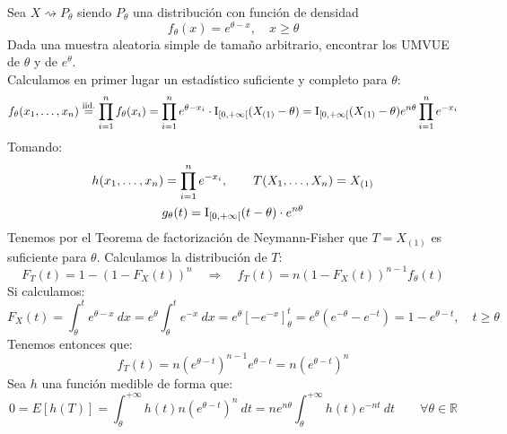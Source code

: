 \begin{ejercicio}\label{ej:7_rel4}
    Sea $X\rightsquigarrow P_\theta$ siendo $P_\theta$ una distribución con función de densidad
    \begin{equation*}
        f_\theta(x) = e^{\theta-x}, \quad x\geq \theta
    \end{equation*}
    Dada una muestra aleatoria simple de tamaño arbitrario, encontrar los UMVUE de $\theta$ y de $e^{\theta}$.\\

    \noindent
    Calculamos en primer lugar un estadístico suficiente y completo para $\theta$:
    \begin{equation*}
        f_\theta(x_1, \ldots, x_n) \stackrel{\text{iid.}}{=} \prod_{i=1}^{n}f_\theta(x_i) = \prod_{i=1}^{n} e^{\theta-x_i} \cdot \operatorname{I}_{\left[0,+\infty\right[}(X_{(1)}-\theta)=\operatorname{I}_{\left[0,+\infty\right[}(X_{(1)}-\theta) e^{n\theta}\prod_{i=1}^{n} e^{-x_i}
    \end{equation*}
    Tomando:
    \begin{gather*}
        h(x_1, \ldots, x_n) = \prod_{i=1}^{n}e^{-x_i}, \qquad T(X_1, \ldots, X_n) = X_{(1)} \\
        g_\theta(t) = \operatorname{I}_{\left[0,+\infty\right[}(t-\theta) \cdot e^{n\theta}
    \end{gather*}
    Tenemos por el Teorema de factorización de Neymann-Fisher que $T=X_{(1)}$ es suficiente para $\theta$. Calculamos la distribución de $T$:
    \begin{equation*}
        F_T(t) = 1-{(1-F_X(t))}^{n} \quad \Longrightarrow \quad f_T(t) = n{(1-F_X(t))}^{n-1}f_\theta(t)
    \end{equation*}
    Si calculamos:
    \begin{equation*}
        F_X(t) = \int_{\theta}^{t} e^{\theta-x}~dx  = e^{\theta}\int_{\theta}^{t} e^{-x}~dx  = e^{\theta}[-e^{-x}]_\theta^t = e^{\theta}\left(e^{-\theta} - e^{-t}\right) = 1- e^{\theta-t}, \quad t\geq \theta
    \end{equation*}
    Tenemos entonces que:
    \begin{equation*}
        f_T(t) = n{\left(e^{\theta-t}\right)}^{n-1} e^{\theta-t} = n{\left(e^{\theta-t}\right)}^{n}
    \end{equation*}
    Sea $h$ una función medible de forma que:
    \begin{equation*}
        0 = E[h(T)] = \int_{\theta}^{+\infty} h(t)n{\left(e^{\theta-t}\right)}^{n}~dt  = ne^{n\theta} \int_{\theta}^{+\infty}h(t)e^{-nt} ~dt \qquad \forall \theta\in \mathbb{R}

\end{equation*}
\end{ejercicio}
